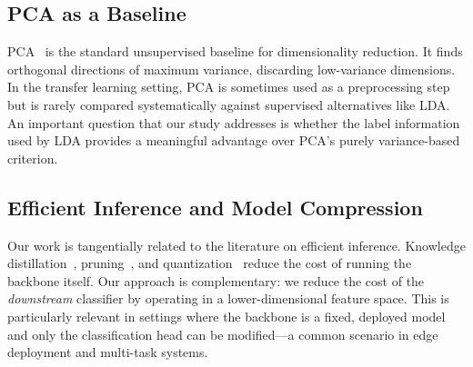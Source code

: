 \subsection{PCA as a Baseline}

PCA~\cite{pearson1901pca} is the standard unsupervised baseline for dimensionality reduction. It finds orthogonal directions of maximum variance, discarding low-variance dimensions. In the transfer learning setting, PCA is sometimes used as a preprocessing step~\cite{sharif2014cnn} but is rarely compared systematically against supervised alternatives like LDA. An important question that our study addresses is whether the label information used by LDA provides a meaningful advantage over PCA's purely variance-based criterion.

\subsection{Efficient Inference and Model Compression}

Our work is tangentially related to the literature on efficient inference. Knowledge distillation~\cite{hinton2015distilling}, pruning~\cite{han2015learning}, and quantization~\cite{jacob2018quantization} reduce the cost of running the backbone itself. Our approach is complementary: we reduce the cost of the \emph{downstream} classifier by operating in a lower-dimensional feature space. This is particularly relevant in settings where the backbone is a fixed, deployed model and only the classification head can be modified---a common scenario in edge deployment and multi-task systems.
